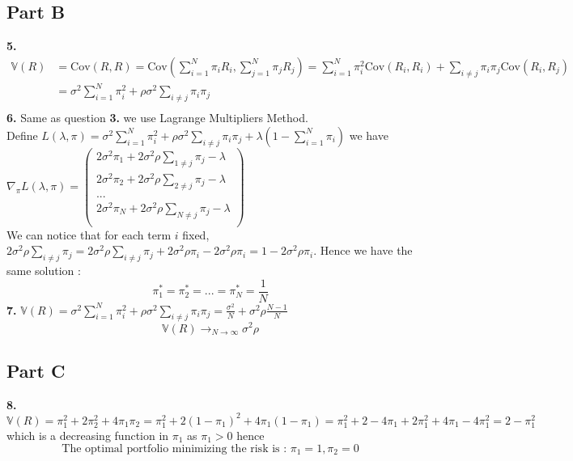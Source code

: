 \documentclass{article}
\begin{document}
\subsection*{Part B}
\textbf{5.}
$$\boxed{\begin{split}
    \mathbb{V}(R) &= \text{Cov}(R,R) = \text{Cov}(\sum\limits_{i=1}^N\pi_iR_i,\sum\limits_{j=1}^N\pi_jR_j) = \sum\limits_{i=1}^N\pi_i^2\text{Cov}(R_i,R_i)+ \sum\limits_{i\neq j}\pi_i\pi_j\text{Cov}(R_i,R_j) \\
    &= \sigma^2\sum\limits_{i=1}^N\pi_i^2+\rho\sigma^2\sum\limits_{i\neq j}\pi_i\pi_j\\
\end{split}}$$
\textbf{6.} Same as question \textbf{3.} we use Lagrange Multipliers Method.
\\
Define $L(\lambda,\pi) = \sigma^2\sum\limits_{i=1}^N\pi_i^2+\rho\sigma^2\sum\limits_{i\neq j}\pi_i\pi_j+\lambda\left(1-\sum\limits_{i=1}^N\pi_i\right)$ we have $\nabla_\pi L(\lambda,\pi) = \left(\begin{array}{c}
    2\sigma^2\pi_1+2\sigma^2\rho\sum\limits_{1\neq j}\pi_j-\lambda\\
    2\sigma^2\pi_2+2\sigma^2\rho\sum\limits_{2\neq j}\pi_j-\lambda\\
    ...\\
    2\sigma^2\pi_N+2\sigma^2\rho\sum\limits_{N\neq j}\pi_j-\lambda\\
\end{array}\right)$
\\
We can notice that for each term $i$ fixed, $2\sigma^2\rho\sum\limits_{i\neq j}\pi_j =2\sigma^2\rho\sum\limits_{i\neq j}\pi_j + 2\sigma^2\rho\pi_i - 2\sigma^2\rho\pi_i =1-2\sigma^2\rho\pi_i$. Hence we have the same solution : $$\boxed{\pi^*_1=\pi_2^*=...=\pi_N^*=\frac{1}{N}}$$
\textbf{7.} $\mathbb{V}(R) = \sigma^2\sum\limits_{i=1}^N\pi_i^2+\rho\sigma^2\sum\limits_{i\neq j}\pi_i\pi_j = \frac{\sigma^2}{N} +\sigma^2\rho\frac{N-1}{N}$ $$\boxed{\mathbb{V}(R) \to_{N\to\infty} \sigma^2\rho}$$


\subsection*{Part C}
\textbf{8.} $\mathbb{V}(R) = \pi_1^2+2\pi_2^2+4\pi_1\pi_2 = \pi_1^2+2(1-\pi_1)^2+4\pi_1(1-\pi_1) = \pi_1^2+2-4\pi_1+2\pi_1^2+4\pi_1-4\pi_1^2 = 2-\pi_1^2$ which is a decreasing function in $\pi_1$ as $\pi_1 >0$ hence $$\boxed{\text{The optimal portfolio minimizing the risk is : } \pi_1=1, \pi_2 = 0}$$
\end{document}
